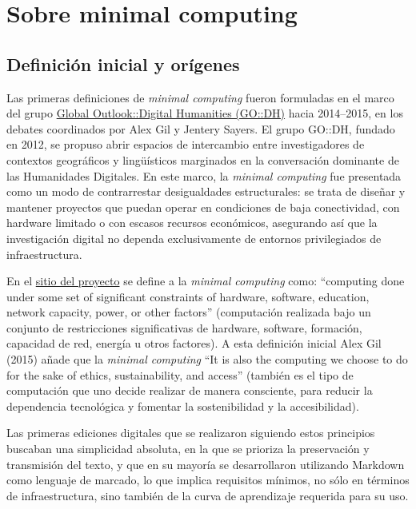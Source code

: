 \documentclass[
  letterpaper,
  DIV=11,
  numbers=noendperiod]{scrreprt}
\begin{document}

\chapter{Sobre minimal computing}\label{sobre-minimal-computing}

\section{Definición inicial y
orígenes}\label{definiciuxf3n-inicial-y-oruxedgenes}

Las primeras definiciones de \emph{minimal computing} fueron formuladas
en el marco del grupo \href{http://www.globaloutlookdh.org/}{Global
Outlook::Digital Humanities (GO::DH)} hacia 2014--2015, en los debates
coordinados por Alex Gil y Jentery Sayers. El grupo GO::DH, fundado en
2012, se propuso abrir espacios de intercambio entre investigadores de
contextos geográficos y lingüísticos marginados en la conversación
dominante de las Humanidades Digitales. En este marco, la \emph{minimal
computing} fue presentada como un modo de contrarrestar desigualdades
estructurales: se trata de diseñar y mantener proyectos que puedan
operar en condiciones de baja conectividad, con hardware limitado o con
escasos recursos económicos, asegurando así que la investigación digital
no dependa exclusivamente de entornos privilegiados de infraestructura.

En el \href{https://go-dh.github.io/mincomp/about/}{sitio del proyecto}
se define a la \emph{minimal computing} como: ``computing done under
some set of significant constraints of hardware, software, education,
network capacity, power, or other factors'' (computación realizada bajo
un conjunto de restricciones significativas de hardware, software,
formación, capacidad de red, energía u otros factores). A esta
definición inicial Alex Gil (2015) añade que la \emph{minimal computing}
``It is also the computing we choose to do for the sake of ethics,
sustainability, and access'' (también es el tipo de computación que uno
decide realizar de manera consciente, para reducir la dependencia
tecnológica y fomentar la sostenibilidad y la accesibilidad).

Las primeras ediciones digitales que se realizaron siguiendo estos
principios buscaban una simplicidad absoluta, en la que se prioriza la
preservación y transmisión del texto, y que en su mayoría se
desarrollaron utilizando Markdown como lenguaje de marcado, lo que
implica requisitos mínimos, no sólo en términos de infraestructura, sino
también de la curva de aprendizaje requerida para su uso.
\end{document}
